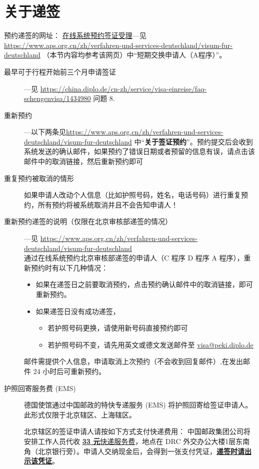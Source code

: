 \documentclass[oneside,final]{book}
\begin{document}
\section{关于递签}\label{sec:visa}
\sloppy 预约递签的网址： \href{https://service2.diplo.de/rktermin/extern/choose_category.do?locationCode=peki&realmId=12&categoryId=156&request_locale=de}{在线系统预约签证受理}---见 \url{https://www.aps.org.cn/zh/verfahren-und-services-deutschland/visum-fur-deutschland} （本节内容均参考该网页）中“短期交换申请人（A程序）”。
\begin{description}
\item[最早可于行程开始前三个月申请签证] ---见 \url{https://china.diplo.de/cn-zh/service/visa-einreise/faq-schengenvisa/1434980} 问题 8.
\item[重新预约] ---以下两条见\sloppy \url{https://www.aps.org.cn/zh/verfahren-und-services-deutschland/visum-fur-deutschland} 中“\textbf{关于签证预约}”。预约提交后会收到系统发送的确认邮件，如果预约了错误日期或者预留的信息有误，请点击该邮件中的取消链接，然后重新预约即可
\item[重复预约被取消的情形] 如果申请人改动个人信息（比如护照号码，姓名，电话号码）进行重复预约，所有预约将被系统取消并且不会告知申请人！ 
\item[重新预约递签的说明（仅限在北京审核部递签的情况）] ---见 \url{https://www.aps.org.cn/zh/verfahren-und-services-deutschland/visum-fur-deutschland}\\
通过在线系统预约北京审核部递签的申请人（C 程序 D 程序 A 程序），重新预约时有以下几种情况：
\begin{itemize}
\item 如果在递签日之前要取消预约，点击预约确认邮件中的取消链接，即可重新预约。
\item 如果递签日没有成功递签，
\begin{itemize}
  \item 若护照号码更换，请使用新号码直接预约即可
  \item 若护照号码不变，请先用英文或德文发送邮件至 \href{mailto:visa@peki.diplo.de}{visa@peki.diplo.de}
\end{itemize}
\end{itemize}
邮件需提供个人信息，申请取消上次预约（不会收到回复邮件）,在发出邮件 24 小时后可重新预约。
\item[护照回寄服务费 (EMS)]

德国使馆通过中国邮政的特快专递服务 (EMS) 将护照回寄给签证申请人。此形式仅限于北京辖区、上海辖区。

北京辖区的签证申请人请按如下方式支付快递费用：
中国邮政集团公司将安排工作人员代收 \underline{\label{inline-money}\textbf{33 元}快递服务费}，地点在 DRC 外交办公大楼1层东南角（北京银行旁）。申请人交纳现金后，会得到一张支付凭证，\underline{\textbf{递签时请出示该凭证}}。


\end{description}
\end{document}

